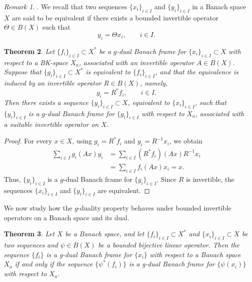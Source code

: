 \documentclass[12pt]{article}
\newtheorem{theorem}{Theorem}[section]
\theoremstyle{definition}
\theoremstyle{remark}
\newtheorem{remark}[theorem]{Remark}
\begin{document}
\begin{remark}\cite[Chapter~I]{Singer1981}.
	We recall that two sequences \(\{x_i\}_{i\in I}\) and
	\(\{y_i\}_{i\in I}\) in a Banach space \(X\) are said to be equivalent
	if there exists a bounded invertible operator
	\(\Theta\in B(X)\) such that
	\[
	y_i=\Theta x_i,\qquad i\in I.
	\]
	

\end{remark}

\begin{theorem}
	Let \(\{f_i\}_{i\in I}\subset X^*\) be a \(g\)-dual Banach frame for
	\(\{x_i\}_{i\in I}\subset X\) with respect to a BK-space \(X_a\),
	associated with an invertible operator \(A\in B(X)\).
	Suppose that \(\{g_i\}_{i\in I}\subset X^*\) is equivalent to
	\(\{f_i\}_{i\in I}\), and that the equivalence is induced by an
	invertible operator \(R\in B(X)\), namely,
	\[
	g_i=R^*f_i,\qquad i\in I.
	\]
	Then there exists a sequence \(\{y_i\}_{i\in I}\subset X\), equivalent
	to \(\{x_i\}_{i\in I}\), such that \(\{y_i\}_{i\in I}\) is a
	\(g\)-dual Banach frame for \(\{g_i\}_{i\in I}\) with respect to
	\(X_a\), associated with a suitable invertible operator on \(X\).
\end{theorem}

\begin{proof}
	For every \(x\in X\), using \(g_i=R^*f_i\) and
	\(y_i=R^{-1}x_i\), we obtain
	\[
	\begin{aligned}
		\sum_{i\in I}g_i(Ax)y_i
		&=\sum_{i\in I}(R^*f_i)(Ax)R^{-1}x_i\\
		&=\sum_{i\in I}f_i(Ax)x_i
		=x.
	\end{aligned}
	\]
	Thus, \(\{y_i\}_{i\in I}\) is a \(g\)-dual Banach frame for
	\(\{g_i\}_{i\in I}\). Since \(R\) is invertible, the sequences
	\(\{x_i\}_{i\in I}\) and \(\{y_i\}_{i\in I}\) are equivalent.
\end{proof}
\noindent
    We now study how the \(g\)-duality property behaves under bounded invertible operators on a Banach space and its dual.
    

\begin{theorem}
Let \( X \) be a Banach space, and let \( \{f_i\}_{i \in I} \subset X^* \) and \( \{x_i\}_{i \in I} \subset X \) be two sequences and \( \psi \in B(X) \) be a bounded bijective linear operator. Then the sequence \( \{f_i\} \) is a g-dual Banach frame for \( \{x_i\} \) with respect to a Banach space \( X_a \) if and only if the sequence \( \{\psi^*(f_i)\} \) is a g-dual Banach frame for \( \{\psi(x_i)\} \) with respect to \( X_a \).
\end{theorem}
\end{document}
